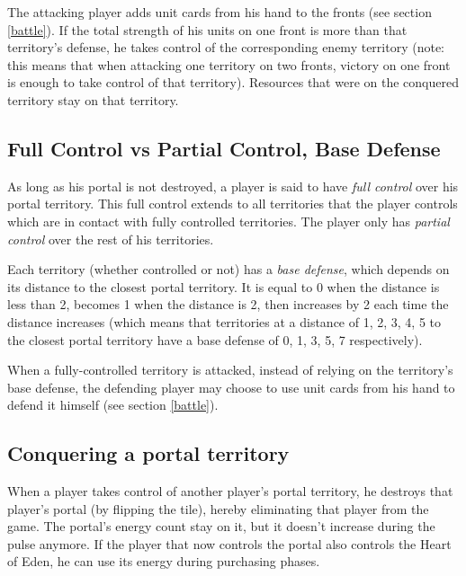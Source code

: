 \documentclass[a4paper]{article}
\begin{document}
        The attacking player adds unit cards from his hand to the fronts
        (see section \ref{battle}).
        If the total strength of his units on one front is more than that territory's
        defense, he takes control of the corresponding enemy territory
        (note: this means that when attacking one territory on two fronts,
        victory on one front is enough to take control of that territory).
        Resources that were on the conquered territory stay on that territory.
        
    \subsection{Full Control vs Partial Control, Base Defense}
        \label{base-defense}
        As long as his portal is not destroyed,
        a player is said to have \textit{full control} over his portal territory.
        This full control extends to all territories that the player controls
        which are in contact with fully controlled territories.
        The player only has \textit{partial control} over the rest of his territories.
        
        Each territory (whether controlled or not) has a \textit{base defense},
        which depends on its distance to the closest portal territory.
        It is equal to 0  when the distance is less than 2,
        becomes 1 when the distance is 2,
        then increases by 2 each time the distance increases
        (which means that territories at a distance of 1, 2, 3, 4, 5
        to the closest portal territory have a base defense of  0, 1, 3, 5, 7
        respectively).
        
        When a fully-controlled territory is attacked,
        instead of relying on the territory's base defense,
        the defending player may choose to use unit cards from his hand to defend it
        himself (see section \ref{battle}).
        
    \subsection{Conquering a portal territory}
        When a player takes control of another player's portal territory,
        he destroys that player's portal (by flipping the tile),
        hereby eliminating that player from the game.
        The portal's energy count stay on it,
        but it doesn't increase during the pulse anymore.
        If the player that now controls the portal also controls the Heart of Eden,
        he can use its energy during purchasing phases.
        
\end{document}

